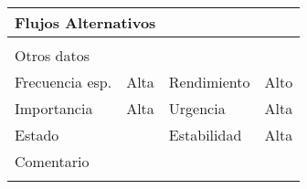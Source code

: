 \documentclass{article}
\begin{document}
\begin{table}[h]
\begin{tabular}{|l|l|l|l|l|l|}
\hline
\multicolumn{6}{|p{10cm}|}{Flujos Alternativos}\\
\hline
\multicolumn{1}{|p{1cm}}{} & \multicolumn{5}{|p{9cm}|}{}\\
\hline
\multicolumn{6}{|p{10cm}|}{Otros datos}\\
\hline
\multicolumn{1}{|p{2cm}|}{Frecuencia esp.} & \multicolumn{2}{p{3cm}}{Alta} & \multicolumn{1}{|p{2cm}|}{Rendimiento} & \multicolumn{2}{p{3cm}|}{Alto}\\
\hline
\multicolumn{1}{|p{2cm}|}{Importancia} & \multicolumn{2}{p{3cm}}{Alta} & \multicolumn{1}{|p{2cm}|}{Urgencia} & \multicolumn{2}{p{3cm}|}{Alta}\\
\hline
\multicolumn{1}{|p{2cm}|}{Estado} & \multicolumn{2}{p{3cm}}{} & \multicolumn{1}{|p{2cm}|}{Estabilidad} & \multicolumn{2}{p{3cm}|}{Alta}\\
\hline
\multicolumn{6}{|p{10cm}|}{Comentario}\\
\hline
\multicolumn{6}{|p{10cm}|}{}\\
\hline
\end{tabular}
\end{table}
\addtocounter{ni}{1}
\end{document}
